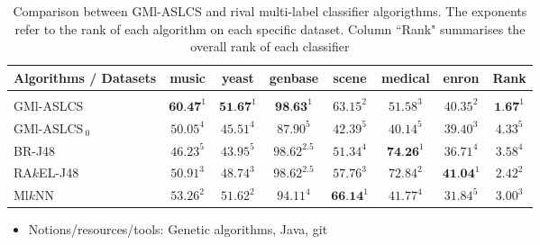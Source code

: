 \begin{table}[!h]
  \begin{center}
    \begin{tabular}{l|cccccc|c}
    Algorithms / Datasets& music     & yeast     & genbase       & scene     & medical   & enron     & Rank \\
    \toprule \\ [-2ex]
    GMl-ASLCS         & $\textbf{60.47}^1$ & $\textbf{51.67}^1$ & $\textbf{98.63}^1$  & $63.15^2$ & $51.58^3$ & $40.35^2$ & $\textbf{1.67}^1$ \\
    GMl-ASLCS$_{\:0}$ & $50.05^4$ & $45.51^4$ & $87.90^5$     & $42.39^5$ & $40.14^5$ & $39.40^3$ & $4.33^5$                                  \\
    BR-J48            & $46.23^5$ & $43.95^5$ & $98.62^{2.5}$ & $51.34^4$ & $\textbf{74.26}^1$ & $36.71^4$ & $3.58^4$                         \\
    RA$k$EL-J48       & $50.91^3$ & $48.74^3$ & $98.62^{2.5}$ & $57.76^3$ & $72.84^2$ & $\textbf{41.04}^1$ & $2.42^2$                         \\
    Ml$k$NN           & $53.26^2$ & $51.62^2$ & $94.11^4$     & $\textbf{66.14}^1$ & $41.77^4$ & $31.84^5$ & $3.00^3$                         \\ \bottomrule
    \end{tabular}
    \caption{\small Comparison between GMl-ASLCS and rival multi-label
             classifier algorigthms.  The exponents refer to the rank of each
             algorithm on each specific dataset.  Column ``Rank" summarises the
             overall rank of each classifier}
	\label{table:accuracyBasedComparison}
    \end{center}
\end{table}

\begin{itemize}
  \item Notions/resources/tools: Genetic algorithms, Java, git
\end{itemize}
